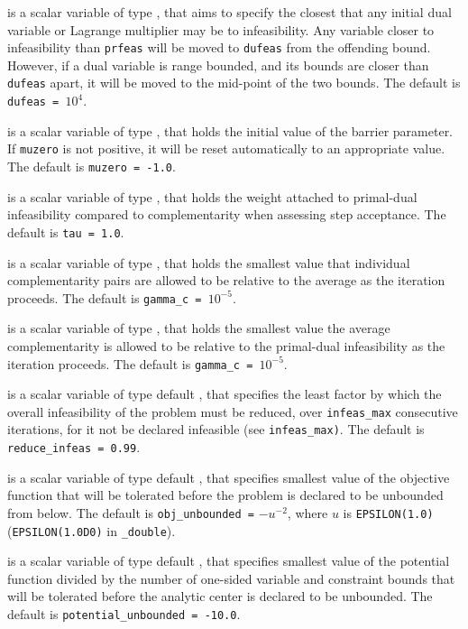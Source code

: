 \begin{description}
 is a scalar variable of type \realdp, that aims to specify
the closest that any initial dual variable or Lagrange multiplier may be to
infeasibility. Any variable closer to infeasibility than {\tt prfeas} will be
moved to {\tt dufeas} from the offending bound. However, if a dual variable
is range bounded, and its bounds are closer than {\tt dufeas} apart, it will
be moved to the mid-point of the two bounds.
The default is {\tt dufeas = $10^4$}.

  is a scalar variable of type \realdp, that holds the
initial value of the barrier parameter. If {\tt muzero} is
not positive, it will be reset automatically to an appropriate value.
The default is {\tt muzero = -1.0}.

  is a scalar variable of type \realdp, that holds the
weight attached to primal-dual infeasibility compared to complementarity
when assessing step acceptance.
The default is {\tt tau = 1.0}.

  is a scalar variable of type \realdp, that holds the
smallest value that individual complementarity pairs are allowed
to be relative to the average as the iteration proceeds.
The default is {\tt gamma\_c = $10^{-5}$}.

  is a scalar variable of type \realdp, that holds the
smallest value the average complementarity is allowed
to be relative to the primal-dual infeasibility as the iteration proceeds.
The default is {\tt gamma\_c = $10^{-5}$}.

  is a scalar variable of type default
\realdp, that specifies the
least factor by which the overall infeasibility of the problem must be reduced,
over {\tt infeas\_max} consecutive iterations,
for it not be declared infeasible (see {\tt infeas\_max)}.
The default is {\tt reduce\_infeas = 0.99}.

  is a scalar variable of type default
\realdp, that specifies smallest
value of the objective function that will be tolerated before the problem
is declared to be unbounded from below.
The default is {\tt obj\_u\-nbounded =} $-u^{-2}$,
where $u$ is {\tt EPSILON(1.0)} ({\tt EPSILON(1.0D0)} in
{\tt \fullpackagename\_double}).

  is a scalar variable of type default
\realdp, that specifies smallest
value of the potential function divided by the number of one-sided variable and
constraint bounds that will be tolerated before the analytic center is
declared to be unbounded.
The default is {\tt potential\_u\-nbounded = -10.0}.


\end{description}

